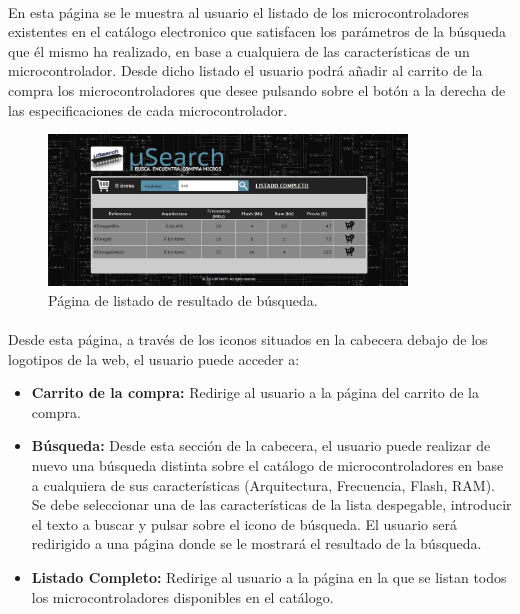 \paragraph{}En esta página se le muestra al usuario el listado de los microcontroladores existentes en el catálogo electronico que satisfacen los parámetros de la búsqueda que él mismo ha realizado, en base a cualquiera de las características de un microcontrolador. Desde dicho listado el usuario podrá añadir al carrito de la compra los microcontroladores que desee pulsando sobre el botón a la derecha de las especificaciones de cada microcontrolador.

\begin{figure}[h!]
	\centering
	\includegraphics[width=0.85\textwidth]{img/listado_busqueda_user}
	\caption{Página de listado de resultado de búsqueda.}
	\label{fig:listado_busqueda_user}
\end{figure}

\paragraph{}Desde esta página, a través de los iconos situados en la cabecera debajo de los logotipos de la web, el usuario puede acceder a:

\begin{itemize}
	\item\textbf{Carrito de la compra:} Redirige al usuario a la página del carrito de la compra.
	
	\item \textbf{Búsqueda:} Desde esta sección de la cabecera, el usuario puede realizar de nuevo una búsqueda distinta sobre el catálogo de microcontroladores en base a cualquiera de sus características (Arquitectura, Frecuencia, Flash, RAM). Se debe seleccionar una de las características de la lista despegable, introducir el texto a buscar y pulsar sobre el icono de búsqueda.
	El usuario será redirigido a una página donde se le mostrará el resultado de la búsqueda.
		
	\item \textbf{Listado Completo:} Redirige al usuario a la página en la que se listan todos los microcontroladores disponibles en el catálogo.
\end{itemize}